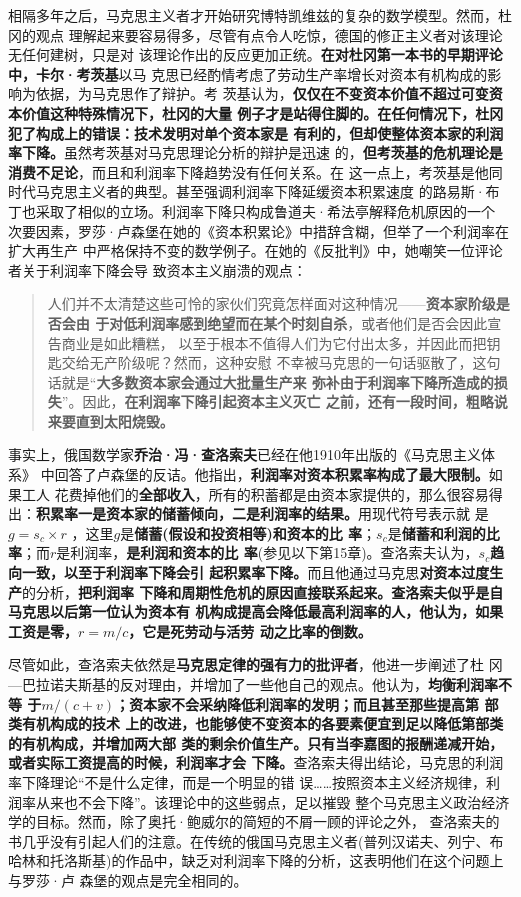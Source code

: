 相隔多年之后，马克思主义者才开始研究博特凯维兹的复杂的数学模型。然而，杜冈的观点
理解起来要容易得多，尽管有点令人吃惊，德国的修正主义者对该理论无任何建树，只是对
该理论作出的反应更加正统。\textbf{在对杜冈第一本书的早期评论中，卡尔·考茨基}以马
克思已经酌情考虑了劳动生产率增长对资本有机构成的影响为依据，为马克思作了辩护。考
茨基认为，\textbf{仅仅在不变资本价值不超过可变资本价值这种特殊情况下，杜冈的大量
  例子才是站得住脚的。在任何情况下，杜冈犯了构成上的错误：技术发明对单个资本家是
  有利的，但却使整体资本家的利润率下降。}虽然考茨基对马克思理论分析的辩护是迅速
的，\textbf{但考茨基的危机理论是消费不足论}，而且和利润率下降趋势没有任何关系。在
这一点上，考茨基是他同时代马克思主义者的典型。甚至强调利润率下降延缓资本积累速度
的路易斯·布丁也采取了相似的立场。利润率下降只构成鲁道夫·希法亭解释危机原因的一个
次要因素，罗莎·卢森堡在她的《资本积累论》中措辞含糊，但举了一个利润率在扩大再生产
中严格保持不变的数学例子。在她的《反批判》中，她嘲笑一位评论者关于利润率下降会导
致资本主义崩溃的观点：
\begin{quotation}
  人们并不太清楚这些可怜的家伙们究竟怎样面对这种情况——\textbf{资本家阶级是否会由
    于对低利润率感到绝望而在某个时刻自杀}，或者他们是否会因此宣告商业是如此糟糕，
  以至于根本不值得人们为它付出太多，并因此而把钥匙交给无产阶级呢？然而，这种安慰
  不幸被马克思的一句话驱散了，这句话就是“\textbf{大多数资本家会通过大批量生产来
    弥补由于利润率下降所造成的损失}”。因此，\textbf{在利润率下降引起资本主义灭亡
    之前，还有一段时间，粗略说来要直到太阳烧毁。}
\end{quotation}
事实上，俄国数学家\textbf{乔治·冯·查洛索夫}已经在他1910年出版的《马克思主义体系》
中回答了卢森堡的反诘。他指出，\textbf{利润率对资本积累率构成了最大限制。}如果工人
花费掉他们的\textbf{全部收入}，所有的积蓄都是由资本家提供的，那么很容易得
出：\textbf{积累率一是资本家的储蓄倾向，二是利润率的结果。}用现代符号表示就
是 $g=s_c \times r$ ，这里$g$是\textbf{储蓄(假设和投资相等)和资本的比
  率}；$s_c$是\textbf{储蓄和利润的比率}；而$r$是利润率，\textbf{是利润和资本的比
  率}(参见以下第15章)。查洛索夫认为，\textbf{$s_c$趋向一致，以至于利润率下降会引
  起积累率下降。}而且他通过马克思\textbf{对资本过度生产}的分析，\textbf{把利润率
  下降和周期性危机的原因直接联系起来。查洛索夫似乎是自马克思以后第一位认为资本有
  机构成提高会降低最高利润率的人，他认为，如果工资是零，$r=m/c$，它是死劳动与活劳
  动之比率的倒数。}

尽管如此，查洛索夫依然是\textbf{马克思定律的强有力的批评者}，他进一步阐述了杜
冈—巴拉诺夫斯基的反对理由，并增加了一些他自己的观点。他认为，\textbf{均衡利润率不等
于$m/(c+v)$；资本家不会采纳降低利润率的发明；而且甚至那些提高第 部类有机构成的技术
上的改进，也能够使不变资本的各要素便宜到足以降低第部类的有机构成，并增加两大部
类的剩余价值生产。只有当李嘉图的报酬递减开始，或者实际工资提高的时候，利润率才会
下降。}查洛索夫得出结论，马克思的利润率下降理论“不是什么定律，而是一个明显的错
误……按照资本主义经济规律，利润率从来也不会下降”。该理论中的这些弱点，足以摧毁
整个马克思主义政治经济学的目标。然而，除了奥托·鲍威尔的简短的不屑一顾的评论之外，
查洛索夫的书几乎没有引起人们的注意。在传统的俄国马克思主义者(普列汉诺夫、列宁、布
哈林和托洛斯基)的作品中，缺乏对利润率下降的分析，这表明他们在这个问题上与罗莎·卢
森堡的观点是完全相同的。

